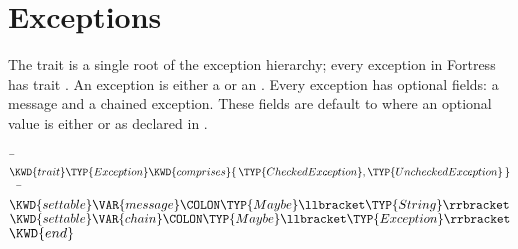 %
%
%
%

\chapter{Exceptions}


The trait  is a single root of the exception hierarchy;
every exception in Fortress has trait .
An exception is either a  or an
.
Every exception has optional fields: a message and a chained exception.
These fields are default to 
where an optional value  is either  or
 as declared in .


\begin{Fortress}
{\tt~}\pushtabs\=\+\( \KWD{trait} \TYP{Exception} \KWD{comprises} \{\,\TYP{CheckedException}, \TYP{UncheckedException}\,\}\)\\
{\tt~~}\pushtabs\=\+\(   \KWD{settable} \VAR{message}\COLON \TYP{Maybe}\llbracket\TYP{String}\rrbracket\)\\
\(   \KWD{settable} \VAR{chain}\COLON \TYP{Maybe}\llbracket\TYP{Exception}\rrbracket\)\-\\\poptabs
\( \KWD{end}\)\-\\\poptabs
\end{Fortress}


